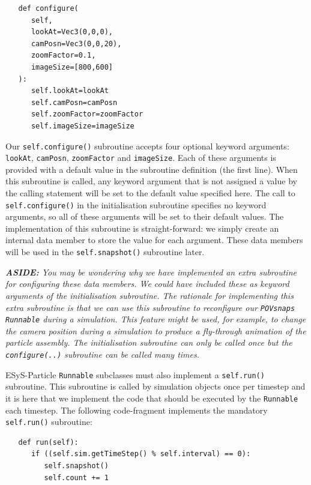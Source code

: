 \begin{verbatim}
   def configure(
      self, 
      lookAt=Vec3(0,0,0), 
      camPosn=Vec3(0,0,20), 
      zoomFactor=0.1,
      imageSize=[800,600]
   ):
      self.lookAt=lookAt
      self.camPosn=camPosn
      self.zoomFactor=zoomFactor
      self.imageSize=imageSize
\end{verbatim}

Our \texttt{self.configure()} subroutine accepts four optional keyword arguments: \texttt{lookAt}, \texttt{camPosn}, \texttt{zoomFactor} and \texttt{imageSize}. Each of these arguments is provided with a default value in the subroutine definition (the first line). When this subroutine is called, any keyword argument that is not assigned a value by the calling statement will be set to the default value specified here. The call to \texttt{self.configure()} in the initialisation subroutine specifies no keyword arguments, so all of these arguments will be set to their default values. The implementation of this subroutine is straight-forward: we simply create an internal data member to store the value for each argument. These data members will be used in the \texttt{self.snapshot()} subroutine later. 

\vskip 5mm
\begin{minipage}{5.75in}
\emph{\textbf{ASIDE:} You may be wondering why we have implemented an extra subroutine for configuring these data members. We could have included these as keyword arguments of the initialisation subroutine. The rationale for implementing this extra subroutine is that we can use this subroutine to reconfigure our \texttt{POVsnaps Runnable} during a simulation. This feature might be used, for example, to change the camera position during a simulation to produce a fly-through animation of the particle assembly. The initialisation subroutine can only be called once but the \texttt{configure(..)} subroutine can be called many times.}
\end{minipage}
\vskip 5mm

ESyS-Particle \texttt{Runnable} subclasses must also implement a \texttt{self.run()} subroutine. This subroutine is called by simulation objects once per timestep and it is here that we implement the code that should be executed by the \texttt{Runnable} each timestep. The following code-fragment implements the mandatory \texttt{self.run()} subroutine:

\begin{verbatim}
   def run(self):
      if ((self.sim.getTimeStep() % self.interval) == 0):
         self.snapshot()
         self.count += 1
\end{verbatim}

